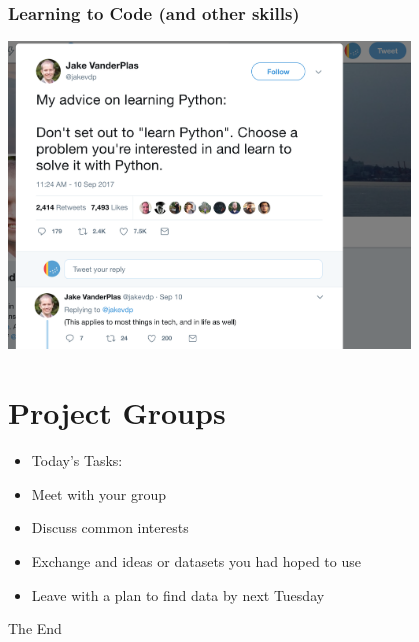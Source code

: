 \documentclass[14pt]{beamer}
\begin{document}
\begin{frame}
\frametitle{Learning to Code (and other skills)}
\centerline{\includegraphics[width=0.8\textwidth]{images_20170912_skills.png}}
\end{frame}

\section{Project Groups}


\begin{frame}
	\begin{itemize}
		\item<+-> {\Large Today's Tasks:}
		\item<+-> Meet with your group
		\item<+-> Discuss common interests
		\item<+-> Exchange and ideas or datasets you had hoped to use
		\item<+-> Leave with a plan to find data by next Tuesday
	\end{itemize}
\end{frame}


\begin{frame}
\Huge{\centerline{The End}}
\end{frame}

\end{document}
